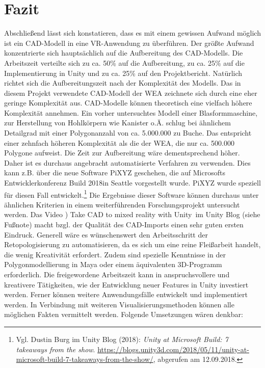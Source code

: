 \chapter{Fazit}
\label{sec:Fazit}

Abschließend lässt sich konstatieren, dass es mit einem gewissen Aufwand möglich ist ein CAD-Modell in eine VR-Anwendung zu überführen. Der größte Aufwand konzentrierte sich hauptsächlich auf die Aufbereitung des CAD-Modells. Die Arbeitszeit verteilte sich zu ca. 50\% auf die Aufbereitung, zu ca. 25\% auf die Implementierung in Unity und zu ca. 25\% auf den Projektbericht. Natürlich richtet sich die Aufbereitungszeit nach der Komplexität des Modells. Das in diesem Projekt verwendete CAD-Modell der WEA zeichnete sich durch eine eher geringe Komplexität aus. CAD-Modelle können theoretisch eine vielfach höhere Komplexität annehmen. 
Ein vorher untersuchtes Modell einer \glqq Blasformmaschine\grqq, zur Herstellung von Hohlkörpern wie Kanister o.Ä. schlug bei ähnlichem Detailgrad mit einer Polygonanzahl von ca. 5.000.000 zu Buche. Das entspricht einer zehnfach höheren Komplexität als die der WEA, die nur ca. 500.000 Polygone aufweist. Die Zeit zur Aufbereitung wäre dementsprechend höher. Daher ist  es durchaus angebracht automatisierte Verfahren zu verwenden. Dies kann z.B. über die neue Software PiXYZ geschehen, die auf Microsofts Entwicklerkonferenz \glqq Build 2018\grqq in Seattle vorgestellt wurde. PiXYZ wurde speziell für diesen Fall entwickelt.\footnote{Vgl. Dustin Burg im Unity Blog (2018): \textit{Unity at Microsoft Build: 7 takeaways from the show}.\newline
\url{https://blogs.unity3d.com/2018/05/11/unity-at-microsoft-build-7-takeaways-from-the-show/},\newline 
abgerufen am 12.09.2018.} Die Ergebnisse dieser Software können durchaus unter ähnlichen Kriterien in einem weiterführenden Forschungsprojekt untersucht werden. Das Video ) Take CAD to mixed reality with Unity\grqq\, im Unity Blog (siehe Fußnote) macht bzgl. der Qualität des CAD-Imports  einen sehr guten ersten Eindruck. Generell wäre es wünschenswert den Arbeitsschritt der Retopologisierung zu automatisieren, da es sich um eine reine Fleißarbeit handelt, die wenig Kreativität erfordert. Zudem sind spezielle Kenntnisse in der Polygonmodellierung in Maya oder einem äquivalenten 3D-Programm erforderlich. Die freigewordene  Arbeitszeit kann in anspruchsvollere und kreativere Tätigkeiten, wie der Entwicklung neuer Features in Unity investiert werden.
Ferner können weitere Anwendungsfälle entwickelt und implementiert werden. In Verbindung mit weiteren Visualisierungsmethoden können alle möglichen Fakten vermittelt werden. Folgende Umsetzungen wären denkbar:
